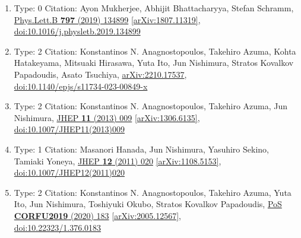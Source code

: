 \documentclass[a4paper,10pt]{article}
\begin{document}
\begin{enumerate}
\begin{enumerate}
  \item Type: 0 Citation: Ayon Mukherjee, Abhijit Bhattacharyya, Stefan Schramm, \href{https://www.doi.org/10.1016/j.physletb.2019.134899}{Phys.Lett.B {\bf 797} (2019) 134899}  \href{https://arxiv.org/abs/1807.11319}{[arXiv:1807.11319]},\\\href{https://www.doi.org/10.1016/j.physletb.2019.134899}{doi:10.1016/j.physletb.2019.134899}
  \item Type: 2 Citation: Konstantinos N. Anagnostopoulos, Takehiro Azuma, Kohta Hatakeyama, Mitsuaki Hirasawa, Yuta Ito, Jun Nishimura, Stratos Kovalkov Papadoudis, Asato Tsuchiya, \href{https://arxiv.org/abs/2210.17537}{arXiv:2210.17537},\\\href{https://www.doi.org/10.1140/epjs/s11734-023-00849-x}{doi:10.1140/epjs/s11734-023-00849-x}
  \item Type: 2 Citation: Konstantinos N. Anagnostopoulos, Takehiro Azuma, Jun Nishimura, \href{https://www.doi.org/10.1007/JHEP11(2013)009}{JHEP {\bf 11} (2013) 009}  \href{https://arxiv.org/abs/1306.6135}{[arXiv:1306.6135]},\\\href{https://www.doi.org/10.1007/JHEP11(2013)009}{doi:10.1007/JHEP11(2013)009}
  \item Type: 1 Citation: Masanori Hanada, Jun Nishimura, Yasuhiro Sekino, Tamiaki Yoneya, \href{https://www.doi.org/10.1007/JHEP12(2011)020}{JHEP {\bf 12} (2011) 020}  \href{https://arxiv.org/abs/1108.5153}{[arXiv:1108.5153]},\\\href{https://www.doi.org/10.1007/JHEP12(2011)020}{doi:10.1007/JHEP12(2011)020}
  \item Type: 2 Citation: Konstantinos N. Anagnostopoulos, Takehiro Azuma, Yuta Ito, Jun Nishimura, Toshiyuki Okubo, Stratos Kovalkov Papadoudis, \href{https://www.doi.org/10.22323/1.376.0183}{PoS {\bf CORFU2019} (2020) 183}  \href{https://arxiv.org/abs/2005.12567}{[arXiv:2005.12567]},\\\href{https://www.doi.org/10.22323/1.376.0183}{doi:10.22323/1.376.0183}

\end{enumerate}
\end{enumerate}
\end{document}

